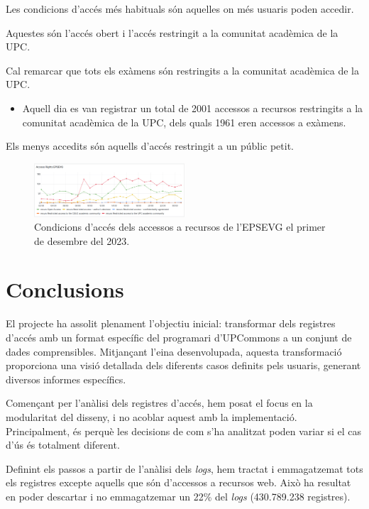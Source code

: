 \documentclass[lettersize,journal]{IEEEtran}
\begin{document}
Les condicions d'accés més habituals són aquelles on més usuaris poden accedir.

Aquestes són l'accés obert i l'accés restringit a la comunitat acadèmica de la UPC.

Cal remarcar que tots els exàmens són restringits a la comunitat acadèmica de la UPC.
\begin{itemize}
    \item Aquell dia es van registrar un total de 2001 accessos a recursos restringits a la comunitat acadèmica de la UPC, dels quals 1961 eren accessos a exàmens.
\end{itemize}

Els menys accedits són aquells d'accés restringit a un públic petit.

\begin{figure}[!t]
    \centerline{\includegraphics[width=0.5\textwidth]{figures/access-rights-epsevg}}
    \caption{Condicions d'accés dels accessos a recursos de l'EPSEVG el primer de desembre del 2023.}\label{fig:log-access-type}
\end{figure}

\section{Conclusions}\label{sec:conclusions}

El projecte ha assolit plenament l'objectiu inicial: transformar dels registres d'accés amb un format específic del programari d'UPCommons a un conjunt de dades comprensibles.
Mitjançant l'eina desenvolupada, aquesta transformació proporciona una visió detallada dels diferents casos definits pels usuaris, generant diversos informes específics.

Començant per l'anàlisi dels registres d'accés, hem posat el focus en la modularitat del disseny, i no acoblar aquest amb la implementació.
Principalment, és perquè les decisions de com s'ha analitzat poden variar si el cas d'ús és totalment diferent.

Definint els passos a partir de l'anàlisi dels \textit{logs}, hem tractat i emmagatzemat tots els registres excepte aquells que són d'accessos a recursos web.
Això ha resultat en poder descartar i no emmagatzemar un 22\% del \textit{logs} (430.789.238 registres).
\end{document}
